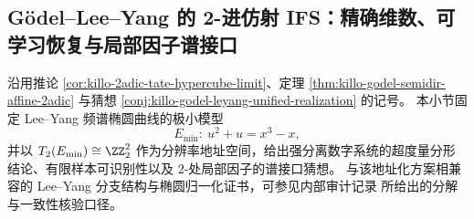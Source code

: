 \subsection{Gödel--Lee--Yang 的 2-进仿射 IFS：精确维数、可学习恢复与局部因子谱接口}\label{subsec:conclusion-godel-leyang-2adic-ifs-dimension-learning-local-factor}
沿用推论 \ref{cor:killo-2adic-tate-hypercube-limit}、定理 \ref{thm:killo-godel-semidir-affine-2adic} 与猜想 \ref{conj:killo-godel-leyang-unified-realization} 的记号。
本小节固定 Lee--Yang 频谱椭圆曲线的极小模型
\[
E_{\min}:\ u^2+u=x^3-x,
\]
并以 \(T_2(E_{\min})\cong\ZZ_2^2\) 作为分辨率地址空间，给出强分离数字系统的超度量分形结论、有限样本可识别性以及 \(2\)-处局部因子的谱接口猜想。
与该地址化方案相兼容的 Lee--Yang 分支结构与椭圆归一化证书，可参见内部审计记录 \cite{Internal2026TerminalZmLeeYangEllipticS4Audit} 所给出的分解与一致性核验口径。




